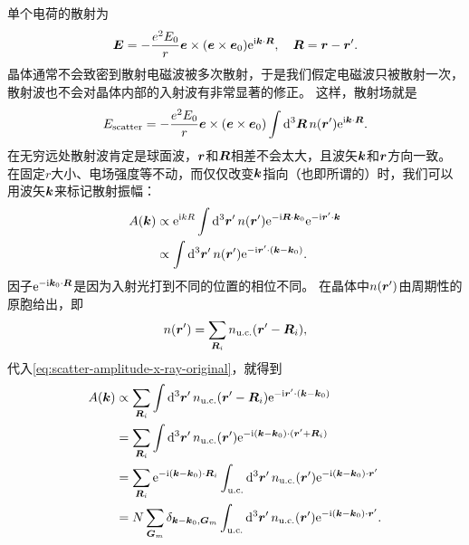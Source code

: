 单个电荷的散射为
\begin{equation}
    \vb*{E} = - \frac{e^2 E_0}{r} \vb*{e} \times (\vb*{e} \times \vb*{e}_0) \mathrm{e}^{\mathrm{i} \vb*{k} \cdot \vb*{R}}, \quad \vb*{R} = \vb*{r} - \vb*{r}'.
\end{equation}
晶体通常不会致密到散射电磁波被多次散射，于是我们假定电磁波只被散射一次，散射波也不会对晶体内部的入射波有非常显著的修正。
这样，散射场就是
\begin{equation}
    E_\text{scatter} = -\frac{e^2 E_0}{r} \vb*{e} \times (\vb*{e} \times \vb*{e}_0) \int \dd[3]{\vb*{R}} n(\vb*{r}') \mathrm{e}^{\mathrm{i} \vb*{k} \cdot \vb*{R}}.
\end{equation}
在无穷远处散射波肯定是球面波，$\vb*{r}$和$\vb*{R}$相差不会太大，且波矢$\vb*{k}$和$\vb*{r}$方向一致。
在固定$r$大小、电场强度等不动，而仅仅改变$\vb*{k}$指向（也即所谓的）时，我们可以用波矢$\vb*{k}$来标记散射振幅：
\begin{equation}
    \begin{aligned}
        A(\vb*{k}) &\propto \mathrm{e}^{\mathrm{i} k R} \int \dd[3]{\vb*{r}'} n(\vb*{r}') \mathrm{e}^{- \mathrm{i} \vb*{R} \cdot \vb*{k}_0} \mathrm{e}^{- \mathrm{i} \vb*{r}' \cdot \vb*{k}} \\
        &\propto \int \dd[3]{\vb*{r}'} n(\vb*{r}') \mathrm{e}^{- \mathrm{i} \vb*{r}' \cdot (\vb*{k} - \vb*{k}_0)}.
    \end{aligned}
    \label{eq:scatter-amplitude-x-ray-original}
\end{equation}
因子$\mathrm{e}^{- \mathrm{i} \vb*{k}_0 \cdot \vb*{R}}$是因为入射光打到不同的位置的相位不同。
在晶体中$n(\vb*{r}')$由周期性的原胞给出，即
\begin{equation}
    n(\vb*{r}') = \sum_{\vb*{R}_i} n_\text{u.c.}(\vb*{r}' - \vb*{R}_i),
\end{equation}
代入\eqref{eq:scatter-amplitude-x-ray-original}，就得到
\[
    \begin{aligned}
        A(\vb*{k}) &\propto \sum_{\vb*{R}_i} \int \dd[3]{\vb*{r}'} n_\text{u.c.}(\vb*{r}' - \vb*{R}_i) \mathrm{e}^{-\mathrm{i} \vb*{r}' \cdot (\vb*{k} - \vb*{k}_0)} \\
        &= \sum_{\vb*{R}_i} \int \dd[3]{\vb*{r}'} n_\text{u.c.}(\vb*{r}') \mathrm{e}^{-\mathrm{i} (\vb*{k} - \vb*{k}_0) \cdot (\vb*{r}' + \vb*{R}_i)} \\
        &= \sum_{\vb*{R}_i} \mathrm{e}^{-\mathrm{i} (\vb*{k} - \vb*{k}_0) \cdot \vb*{R}_i} \int_{\text{u.c.}} \dd[3]{\vb*{r}'} n_\text{u.c.}(\vb*{r}') \mathrm{e}^{-\mathrm{i} (\vb*{k} - \vb*{k}_0) \cdot \vb*{r}'} \\
        &= N \sum_{\vb*{G}_m} \delta_{\vb*{k}-\vb*{k}_0 ,\vb*{G}_m} \int_{\text{u.c.}} \dd[3]{\vb*{r}'} n_\text{u.c.}(\vb*{r}') \mathrm{e}^{-\mathrm{i} (\vb*{k} - \vb*{k}_0) \cdot \vb*{r}'}.
    \end{aligned}
\]
